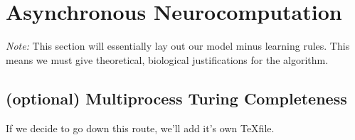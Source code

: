 \section{Asynchronous Neurocomputation}
\emph{Note:} This section will essentially lay out our model minus learning rules. This means we must give theoretical, biological justifications for the algorithm.




\subsection{(optional) Multiprocess Turing Completeness}
If we decide to go down this route, we'll add it's own \TeX file.
